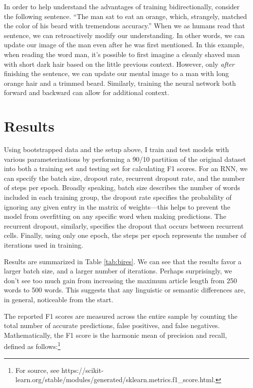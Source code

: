 \documentclass{article}
\begin{document}
	In order to help understand the advantages of training bidirectionally, consider the following sentence. ``The man sat to eat an orange, which, strangely, matched the color of his beard with tremendous accuracy.'' When we as humans read that sentence, we can retroactively modify our understanding. In other words, we can update our image of the man even after he was first mentioned. In this example, when reading the word man, it's possible to first imagine a cleanly shaved man with short dark hair based on the little previous context. However, only \textit{after} finishing the sentence, we can update our mental image to a man with long orange hair and a trimmed beard. Similarly, training the neural network both forward and backward can allow for additional context. 
	
	
		
	\section{Results}
	
	Using bootstrapped data and the setup above, I train and test models with various parameterizations by performing a 90/10 partition of the original dataset into both a training set and testing set for calculating F1 scores. For an RNN, we can specify the batch size, dropout rate, recurrent dropout rate, and the number of steps per epoch. Broadly speaking, batch size describes the number of words included in each training group, the dropout rate specifies the probability of ignoring any given entry in the matrix of weights---this helps to prevent the model from overfitting on any specific word when making predictions. The recurrent dropout, similarly, specifies the dropout that occurs between recurrent cells. Finally, using only one epoch, the steps per epoch represents the number of iterations used in training. 
	
	Results are summarized in Table \ref{tab:bires}. We can see that the results favor a larger batch size, and a larger number of iterations. Perhaps surprisingly, we don't see too much gain from increasing the maximum article length from 250 words to 500 words. This suggests that any linguistic or semantic differences are, in general, noticeable from the start. 
	
	
	
	The reported F1 scores are measured across the entire sample by counting the total number of accurate predictions, false positives, and false negatives. Mathematically, the F1 score is the harmonic mean of precision and recall, defined as follows:\footnote{For source, see https://scikit-learn.org/stable/modules/generated/sklearn.metrics.f1\_score.html.} 
	
\end{document}
